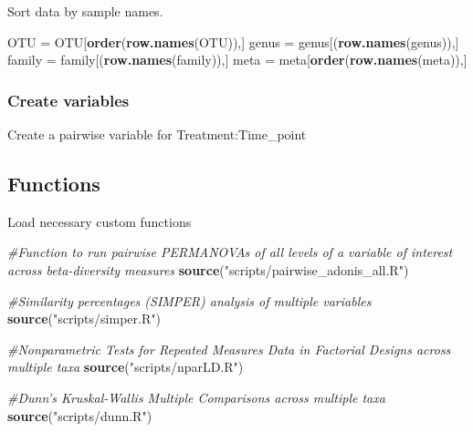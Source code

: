 \documentclass[]{article}
\newenvironment{Shaded}{\begin{snugshade}}{\end{snugshade}}
\newcommand{\KeywordTok}[1]{\textcolor[rgb]{0.13,0.29,0.53}{\textbf{#1}}}
\newcommand{\DataTypeTok}[1]{\textcolor[rgb]{0.13,0.29,0.53}{#1}}
\newcommand{\StringTok}[1]{\textcolor[rgb]{0.31,0.60,0.02}{#1}}
\newcommand{\CommentTok}[1]{\textcolor[rgb]{0.56,0.35,0.01}{\textit{#1}}}
\newcommand{\OperatorTok}[1]{\textcolor[rgb]{0.81,0.36,0.00}{\textbf{#1}}}
\newcommand{\NormalTok}[1]{#1}
\begin{document}
Sort data by sample names.

\begin{Shaded}
\begin{Highlighting}[]
\NormalTok{OTU =}\StringTok{ }\NormalTok{OTU[}\KeywordTok{order}\NormalTok{(}\KeywordTok{row.names}\NormalTok{(OTU)),]}
\NormalTok{genus =}\StringTok{ }\NormalTok{genus[(}\KeywordTok{row.names}\NormalTok{(genus)),]}
\NormalTok{family =}\StringTok{ }\NormalTok{family[(}\KeywordTok{row.names}\NormalTok{(family)),]}
\NormalTok{meta =}\StringTok{ }\NormalTok{meta[}\KeywordTok{order}\NormalTok{(}\KeywordTok{row.names}\NormalTok{(meta)),]}
\end{Highlighting}
\end{Shaded}

\subsubsection{Create variables}\label{create-variables}

Create a pairwise variable for Treatment:Time\_point

\begin{Shaded}
\end{Shaded}

\subsection{Functions}\label{functions}

Load necessary custom functions

\begin{Shaded}
\begin{Highlighting}[]
\CommentTok{#Function to run pairwise PERMANOVAs of all levels of a variable of interest across beta-diversity measures}
\KeywordTok{source}\NormalTok{(}\StringTok{"scripts/pairwise_adonis_all.R"}\NormalTok{)}

\CommentTok{#Similarity percentages (SIMPER) analysis of multiple variables}
\KeywordTok{source}\NormalTok{(}\StringTok{"scripts/simper.R"}\NormalTok{)}

\CommentTok{#Nonparametric Tests for Repeated Measures Data in Factorial Designs across multiple taxa}
\KeywordTok{source}\NormalTok{(}\StringTok{"scripts/nparLD.R"}\NormalTok{)}

\CommentTok{#Dunn's Kruskal-Wallis Multiple Comparisons across multiple taxa}
\KeywordTok{source}\NormalTok{(}\StringTok{"scripts/dunn.R"}\NormalTok{)}
\end{Highlighting}
\end{Shaded}
\end{document}

